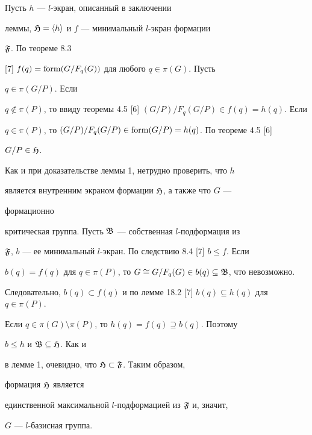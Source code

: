 \begin{pf} 


Пусть $h$ --- $l$-экран, описанный в заключении 


леммы, $\frak H=\langle h\rangle$ и $f$ --- минимальный $l$-экран формации 


$\frak F$. По теореме 8.3 


[7] $f(q)=\operatorname{form}(G/F_q(G))$ для любого $q\in\pi(G)$. Пусть 


$q\in\pi(G/P)$. Если 


$q\notin\pi(P)$, то ввиду теоремы 4.5 [6] $(G/P)/F_q(G/P)\in 


f(q)=h(q)$. Если 


$q\in\pi(P)$, то $(G/P)/F_q(G/P)\in\operatorname{form}(G/P)=h(q)$. По теореме 4.5 [6] 


$G/P\in\frak H$. 


Как и при доказательстве леммы 1, нетрудно проверить, что $h$ 


является внутренним экраном формации $\frak H$, а также что $G$ --- 


формационно 


критическая группа. Пусть $\frak B$ --- собственная $l$-подформация из 


$\frak F$, $b$ --- ее минимальный $l$-экран. По следствию 8.4 [7] $b\le 


f$. Если 


$b(q)=f(q)$ для $q\in\pi(P)$, то $G\cong G/F_q(G)\in b(q)\subseteq\frak 


B$, что невозможно. 


Следовательно, $b(q)\subset f(q)$ и по лемме 18.2 [7] $b(q)\subseteq 


h(q)$ для $q\in\pi(P)$. 


Если $q\in\pi(G)\setminus\pi(P)$, то $h(q)=f(q)\supseteq b(q)$. Поэтому 


$b\le h$ и $\frak B\subseteq\frak H$. Как и 


в лемме 1, очевидно, что $\frak H\subset\frak F$. Таким образом, 


формация $\frak H$ является 


единственной максимальной $l$-подформацией из $\frak F$ и, значит, 


$G$ --- $l$-базисная группа. 


\end{pf} 


 


